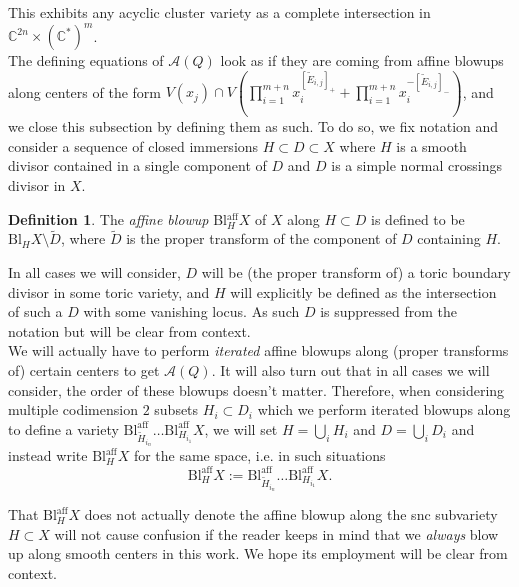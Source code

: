 \documentclass[11pt]{amsart}
\theoremstyle{definition}
\newtheorem{defn}[thm]{Definition}
\theoremstyle{remark}
\numberwithin{equation}{section}
\begin{document}
This exhibits any acyclic cluster variety as a complete intersection in $\mathbb{C}^{2n} \times (\mathbb{C}^*)^m$.\\

The defining equations of $\mathcal{A}(Q)$ look as if they are coming from affine blowups along centers of the form $V(x_j) \cap V(\prod_{i=1}^{m+n} x_i^{[\tilde{E}_{i,j}]_+} + \prod_{i=1}^{m+n} x_i^{-[\tilde{E}_{i,j}]_-})$, and we close this subsection by defining them as such. To do so, we fix notation and consider a sequence of closed immersions $H \subset D \subset X$ where $H$ is a smooth divisor contained in a single component of  $D$ and $D$ is a simple normal crossings divisor in $X$.

\begin{defn}
    The \textit{affine blowup} Bl$_H^{\text{aff}}X$ of $X$ along $H \subset D$ is defined to be $\text{Bl}_H X \setminus \tilde{D}$, where $\tilde{D}$ is the proper transform of the component of $D$ containing $H$.
\end{defn}

In all cases we will consider, $D$ will be (the proper transform of) a toric boundary divisor in some toric variety, and $H$ will explicitly be defined as the intersection of such a $D$ with some vanishing locus. As such $D$ is suppressed from the notation but will be clear from context.\\

We will actually have to perform \textit{iterated} affine blowups along (proper transforms of) certain centers to get $\mathcal{A}(Q)$. It will also turn out that in all cases we will consider, the order of these blowups doesn't matter. Therefore, when considering multiple codimension $2$ subsets $H_i \subset D_i$ which we perform iterated blowups along to define a variety $\text{Bl}_{\tilde{H}_{i_{n}}}^{\text{aff}}\dots \text{Bl}_{H_{i_1}}^{\text{aff}} X$, we will set $H = \bigcup_i H_i$ and $D = \bigcup_i D_i$ and instead write $\mathrm{Bl}_H^{\text{aff}} X$ for the same space, i.e. in such situations $$\mathrm{Bl}_H^{\text{aff}} X := \text{Bl}_{\tilde{H}_{i_{n}}}^{\text{aff}}\dots \text{Bl}_{H_{i_1}}^{\text{aff}} X.$$

That $\mathrm{Bl}_H^{\text{aff}} X$ does not actually denote the affine blowup along the snc subvariety $H \subset X$ will not cause confusion if the reader keeps in mind that we \textit{always} blow up along smooth centers in this work. We hope its employment will be clear from context.\\
\end{document}
